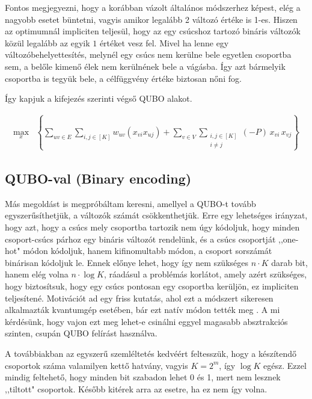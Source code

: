 Fontos megjegyezni, hogy a korábban vázolt általános módszerhez képest, elég a nagyobb esetet büntetni, vagyis amikor legalább 2 változó értéke is 1-es. Hiszen az optimumnál impliciten teljesül, hogy az egy csúcshoz tartozó bináris változók közül legalább az egyik $1$ értéket vesz fel. Mivel ha lenne egy változóbehelyettesítés, melynél egy csúcs nem kerülne bele egyetlen csoportba sem, a belőle kimenő élek nem kerülnének bele a vágásba. Így azt bármelyik csoportba is tegyük bele, a célfüggvény értéke biztosan nőni fog.

Így kapjuk a  kifejezés szerinti végső QUBO alakot.



\begin{align} 
	\max_{x} & \left\{ \sum _{uv \in E}  \sum _{i,j\in [K]} w_{uv}(x_{vi}  x_{uj}) + \sum _{v \in V } \sum _{\substack{ i,j \in [K] \\  i \neq j}} (-P) \, x_{vi} \, x_{vj}\right\} 
	\label{QUBOOnehot}
\end{align}


\subsection{QUBO-val (Binary encoding)}\label{sec:QUBObinary}

Más megoldást is megpróbáltam keresni, amellyel a QUBO-t tovább egyszerűsíthetjük, a változók számát csökkenthetjük. Erre egy lehetséges irányzat, hogy azt, hogy a csúcs mely csoportba tartozik nem úgy kódoljuk, hogy minden csoport-csúcs párhoz egy bináris változót rendelünk, és a csúcs csoportját ,,one-hot" módon kódoljuk, hanem kifinomultabb módon, a csoport sorszámát binárisan kódoljuk le. Ennek előnye lehet, hogy így nem szükséges $n \cdot K$ darab bit, hanem elég volna $n \cdot \log K$, ráadásul a problémás korlátot, amely azért szükséges, hogy biztosítsuk, hogy egy csúcs pontosan egy csoportba kerüljön, ez impliciten teljesítené. Motivációt ad egy friss kutatás, ahol ezt a módszert sikeresen alkalmazták kvantumgép esetében, bár ezt natív módon tették meg  \cite{fuchs2020efficient}. A mi kérdésünk, hogy vajon ezt meg lehet-e csinálni eggyel magasabb absztrakciós szinten, csupán QUBO felírást használva.

A továbbiakban az egyszerű szemléltetés kedvéért feltesszük, hogy a készítendő csoportok száma valamilyen kettő hatvány, vagyis $K=2^m$, így $\log K$ egész. Ezzel mindig feltehető, hogy minden bit szabadon lehet 0 és 1, mert nem lesznek ,,tiltott" csoportok. Később kitérek arra az esetre, ha ez nem így volna.

